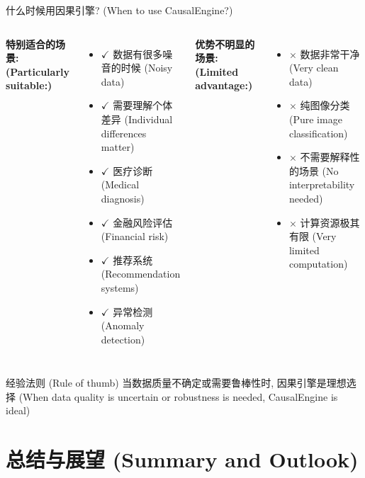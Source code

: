 \documentclass[aspectratio=169,12pt]{beamer}
\begin{document}
\begin{frame}{什么时候用因果引擎? (When to use CausalEngine?)}
\begin{columns}
\textbf{特别适合的场景: (Particularly suitable:)}
\begin{itemize}
    \item $\checkmark$ 数据有很多噪音的时候 (Noisy data)
    \item $\checkmark$ 需要理解个体差异 (Individual differences matter)
    \item $\checkmark$ 医疗诊断 (Medical diagnosis)
    \item $\checkmark$ 金融风险评估 (Financial risk)
    \item $\checkmark$ 推荐系统 (Recommendation systems)
    \item $\checkmark$ 异常检测 (Anomaly detection)
\end{itemize}

\textbf{优势不明显的场景: (Limited advantage:)}
\begin{itemize}
    \item $\times$ 数据非常干净 (Very clean data)
    \item $\times$ 纯图像分类 (Pure image classification)
    \item $\times$ 不需要解释性的场景 (No interpretability needed)
    \item $\times$ 计算资源极其有限 (Very limited computation)
\end{itemize}
\end{columns}

\vspace{1em}
\begin{block}{经验法则 (Rule of thumb)}
当数据质量不确定或需要鲁棒性时, 因果引擎是理想选择 (When data quality is uncertain or robustness is needed, CausalEngine is ideal)
\end{block}
\end{frame}

\section{总结与展望 (Summary and Outlook)}
\end{document}

